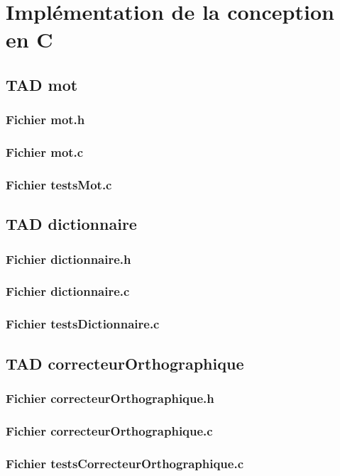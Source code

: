 \section{Implémentation de la conception en C}
	\subsection{TAD mot}
		\subsubsection{Fichier mot.h}
			
		\subsubsection{Fichier mot.c}
			
		\subsubsection{Fichier testsMot.c}
			

	\subsection{TAD dictionnaire}
		\subsubsection{Fichier dictionnaire.h}
			
		\subsubsection{Fichier dictionnaire.c}
			
		\subsubsection{Fichier testsDictionnaire.c}
			

	\subsection{TAD correcteurOrthographique}
		\subsubsection{Fichier correcteurOrthographique.h}
			
		\subsubsection{Fichier correcteurOrthographique.c}
			
		\subsubsection{Fichier testsCorrecteurOrthographique.c}
			


